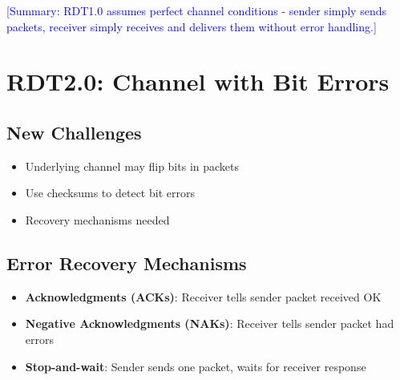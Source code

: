 \documentclass[12pt]{article}
\begin{document}
\textcolor{blue}{[Summary: RDT1.0 assumes perfect channel conditions - sender simply sends packets, receiver simply receives and delivers them without error handling.]}

\section{RDT2.0: Channel with Bit Errors}

\subsection{New Challenges}
\begin{itemize}
    \item Underlying channel may flip bits in packets
    \item Use checksums to detect bit errors
    \item Recovery mechanisms needed
\end{itemize}

\subsection{Error Recovery Mechanisms}
\begin{itemize}
    \item \textbf{Acknowledgments (ACKs)}: Receiver tells sender packet received OK
    \item \textbf{Negative Acknowledgments (NAKs)}: Receiver tells sender packet had errors
    \item \textbf{Stop-and-wait}: Sender sends one packet, waits for receiver response
\end{itemize}
\end{document}
